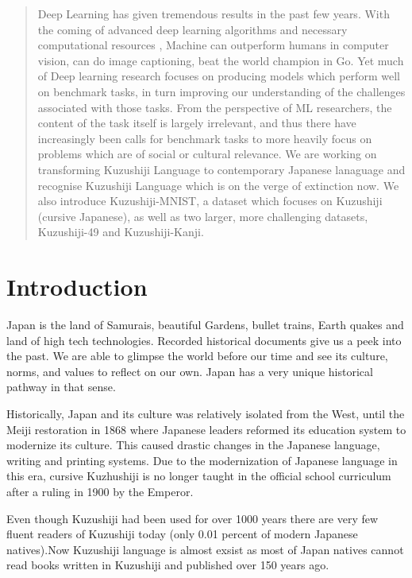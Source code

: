 \documentclass[12pt]{report}
\begin{document}
\begin{abstract}

Deep Learning has given tremendous results in the past few years. With the
coming of advanced deep learning algorithms and necessary
computational resources
, Machine can outperform humans in computer vision,
can do image captioning, beat the world champion in Go.
Yet much of Deep learning research focuses on producing models which perform
well on benchmark tasks, in turn improving our understanding of the challenges
associated with those tasks. From the perspective of ML researchers,
the content of
the task itself is largely irrelevant, and thus there have increasingly been
calls for benchmark tasks to more heavily focus on problems which are of
social or cultural relevance. We are working on transforming Kuzushiji Language
to contemporary Japanese lanaguage and recognise Kuzushiji Language
which is on the
verge of extinction now. We also introduce Kuzushiji-MNIST,
a dataset which focuses on Kuzushiji (cursive Japanese), as well as two larger,
more challenging datasets, Kuzushiji-49 and Kuzushiji-Kanji.
\end{abstract}

\tableofcontents
\listoffigures

\chapter {Introduction}
\label{intro}

\setlength{\parindent}{10ex}Japan is the land of Samurais, beautiful
Gardens, bullet
trains, Earth quakes and land of high tech technologies. Recorded
historical documents
give us a peek into the past. We are able to glimpse the world before
our time and see
its culture, norms, and values to reflect on our own. Japan has a very unique
historical pathway in that sense.

Historically, Japan and its culture was relatively isolated from the
West, until the
Meiji restoration in 1868 where Japanese leaders reformed its
education system to
modernize its culture. This caused drastic changes in the Japanese
language, writing
and printing systems.  Due to the modernization of Japanese language
in this era,
cursive Kuzhushiji is no longer taught in the official school
curriculum after a ruling
in 1900 by the Emperor.

Even though Kuzushiji had been used for over 1000 years there are very
few fluent
readers of Kuzushiji today (only 0.01 percent of modern Japanese
natives).Now Kuzushiji language is almost exsist as most of Japan
natives cannot read books written in Kuzushiji and published over 150
years ago.
\end{document}
